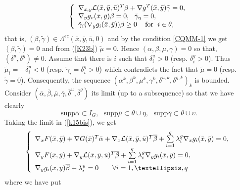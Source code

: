        	\[
       	\left\{
       	\begin{array}
       	[c]{l}%
       	\nabla_{x,y}\mathcal{L}(\bar{x},\bar{y},\bar{u})^{T}\beta+\nabla g^{T}(\bar
       	{x},\bar{y})\tilde{\gamma}=0,\\
       	\nabla_{y}g_{v}(\bar{x},\bar{y})\beta=0,\text{ \ }\tilde{\gamma}_{\eta}=0,\\
       	\tilde{\gamma}_{i}(\nabla_{y}g_{i}(\bar{x},\bar{y}))\beta\geq
       	0\;\;\;\mbox{ for }\;i\in\theta,
       	\end{array}
       	\right.
       	\]
       	that is, $(\beta,\tilde{\gamma})\in\Lambda^{ec}(\bar{x},\bar{y},\bar{u},0) $
       	and by the condition \eqref{CQMM-1} we get $(\beta,\tilde{\gamma})=0$ and from
       	(\ref{K23b}) $\tilde{\mu}=0.$ Hence $(\alpha,\beta,\mu,\gamma)=0$ so that,
       	$(\delta^{u},\delta^{g})\neq0.$ Assume that there is $i$ such that $\delta
       	_{i}^{u}>0$ (resp. $\delta_{i}^{g}>0$). Thus $\tilde{\mu}_{i}=-\delta_{i}
       	^{u}<0$ (resp. $\tilde{\gamma}_{i}=\delta_{i}^{g}>0$) which contradicts the
       	fact that $\tilde{\mu}=0$ (resp. $\tilde{\gamma}=0$)$.$       	
       	Consequently, the sequence $(\alpha^{k},\beta^{k},\mu^{k},\gamma^{k}
       	,\delta^{u,k},\delta^{g,k})_{k}$ is bounded. Consider $(\bar{\alpha}
       	,\overline{\beta},\bar{\mu},\bar{\gamma},\bar{\delta}^{u},\bar{\delta}^{g})$
       	its limit (up to a subsequence) so that we have clearly
       	\[
       	\mathrm{supp}\bar{\alpha}\subset I_{G},\text{ }\mathrm{supp}\bar{\mu}
       	\subset\theta\cup\eta,\text{ }\mathrm{supp}\bar{\gamma}\subset\theta
       	\cup\upsilon.
       	\]
       	Taking the limit in (\ref{k15bis}), we get
       	\[
       	\left\{
       	\begin{array}
       	[c]{l}
       	\nabla_{x}F(\bar{x},\bar{y})+\nabla G(\bar{x})^{T}\bar{\alpha}+\nabla
       	_{x}\mathcal{L}(\bar{x},\bar{y},\bar{u})^{T}\overline{\beta}+\sum
       	\limits_{i=1}^{q}\lambda_{i}^{g}\nabla_{x}g_{i}(\bar{x},\bar{y})=0,	\\[1ex]%
       	\nabla_{y}F(\bar{x},\bar{y})+\nabla_{y}\mathcal{L}(\bar{x},\bar{y},\bar
       	{u})^{T}\overline{\beta}+\sum\limits_{i=1}^{q}\lambda_{i}^{g}\nabla_{y}
       	g_{i}(\bar{x},\bar{y})=0,\\[1ex]
       	\nabla_{y}g_{i}(\bar{x},\bar{y})\overline{\beta}+\lambda_{i}^{u}=0\text{
       		\ \ \ \ \ }\forall i=1,\ldots,q
       	\end{array}
       	\right.
       	\]
       	where we have put
